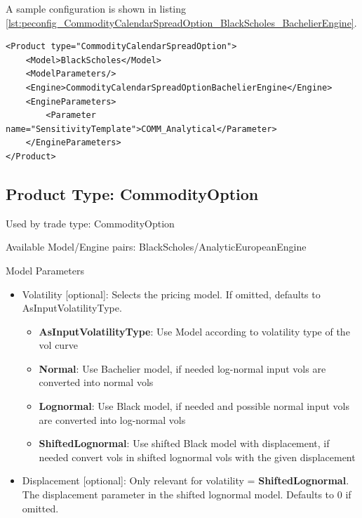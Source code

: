 A sample configuration is shown in listing
\ref{lst:peconfig_CommodityCalendarSpreadOption_BlackScholes_BachelierEngine}.

\begin{longlisting}
\begin{verbatim}
<Product type="CommodityCalendarSpreadOption">
    <Model>BlackScholes</Model>
    <ModelParameters/>
    <Engine>CommodityCalendarSpreadOptionBachelierEngine</Engine>
    <EngineParameters>
        <Parameter name="SensitivityTemplate">COMM_Analytical</Parameter>
    </EngineParameters>
</Product>
\end{verbatim}
\caption{Configuration for Product CommodityCalendarSpreadOption, Model BlackScholes, Engine CommodityCalendarSpreadOptionBachelierEngine}
\label{lst:peconfig_CommodityCalendarSpreadOption_BlackScholes_BachelierEngine}
\end{longlisting}

\subsection{Product Type: CommodityOption}

Used by trade type: CommodityOption

Available Model/Engine pairs: BlackScholes/AnalyticEuropeanEngine

Model Parameters
\begin{itemize}
    \item Volatility [optional]: Selects the pricing model. If omitted, defaults to AsInputVolatilityType.
    \begin{itemize}
        \item \textbf{AsInputVolatilityType}: Use Model according to volatility type of the vol curve
        \item \textbf{Normal}: Use Bachelier model, if needed log-normal input vols are converted into normal vols
        \item \textbf{Lognormal}: Use Black model, if needed and possible normal input vols are converted into log-normal vols
        \item \textbf{ShiftedLognormal}: Use shifted Black model with displacement, if needed convert vols in shifted lognormal vols with the given displacement
    \end{itemize}
    \item Displacement [optional]: Only relevant for volatility = \textbf{ShiftedLognormal}. The displacement parameter in the shifted lognormal model. Defaults to 0 if omitted.
\end{itemize}


